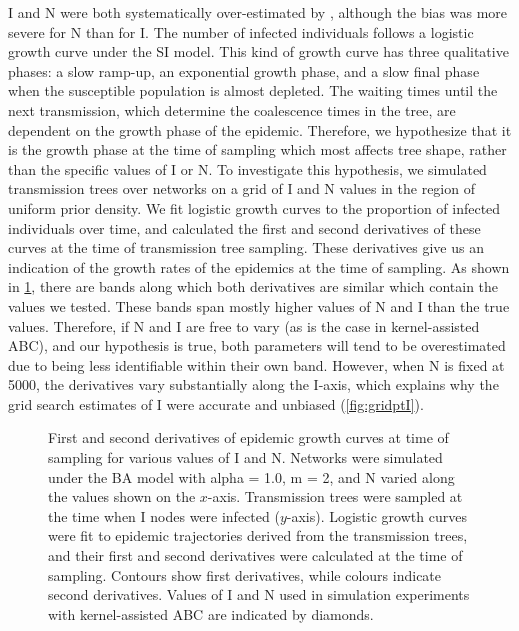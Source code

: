 \gls{I} and \gls{N} were both systematically over-estimated by
, although the bias was more severe for \gls{N} than for
\gls{I}. The number of infected individuals follows a logistic growth curve
under the \gls{SI} model. This kind of growth curve has three qualitative
phases: a slow ramp-up, an exponential growth phase, and a slow final phase
when the susceptible population is almost depleted. The waiting times until the
next transmission, which determine the coalescence times in the tree, are
dependent on the growth phase of the epidemic. Therefore, we hypothesize that
it is the growth phase at the time of sampling which most affects tree shape,
rather than the specific values of \gls{I} or \gls{N}. To investigate this
hypothesis, we simulated transmission trees over networks on a grid of \gls{I}
and \gls{N} values in the region of uniform prior density. We fit logistic
growth curves to the proportion of infected individuals over time, and
calculated the first and second derivatives of these curves at the time of
transmission tree sampling. These derivatives give us an indication of the
growth rates of the epidemics at the time of sampling. As shown in
\cref{fig:derivs}, there are bands along which both derivatives are similar
which contain the values we tested. These bands span mostly higher values of
\gls{N} and \gls{I} than the true values. Therefore, if \gls{N} and \gls{I} are
free to vary (as is the case in kernel-assisted \gls{ABC}), and our hypothesis is true,
both parameters will tend to be overestimated due to being less identifiable
within their own band. However, when \gls{N} is fixed at 5000, the derivatives
vary substantially along the \gls{I}-axis, which explains why the grid search
estimates of \gls{I} were accurate and unbiased (\cref{fig:gridptI}).

\begin{figure}[ht]
  \centering
  \caption[
    First and second derivatives of epidemic growth curves at time of sampling
    for various values of $I$ and $N$.
  ]{
    First and second derivatives of epidemic growth curves at time of sampling
    for various values of \gls{I} and \gls{N}. Networks were simulated under
    the \gls{BA} model with \gls{alpha} = 1.0, \gls{m} = 2, and \gls{N} varied 
    along the values shown on the $x$-axis. Transmission trees were sampled at
    the time when \gls{I} nodes were infected ($y$-axis). Logistic growth
    curves were fit to epidemic trajectories derived from the transmission
    trees, and their first and second derivatives were calculated at the time
    of sampling. Contours show first derivatives, while colours indicate second
    derivatives. Values of \gls{I} and \gls{N} used in simulation experiments
    with kernel-assisted \gls{ABC} are indicated by diamonds.
  }
  \label{fig:derivs}
\end{figure}

